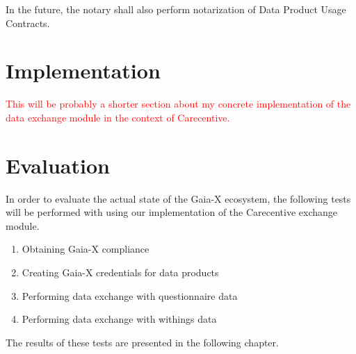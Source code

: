 In the future, the notary shall also perform notarization of Data Product Usage Contracts. %

\section{Implementation}\label{sec:implementation}

\textcolor{red}{This will be probably a shorter section about my concrete implementation of the data exchange module in the context of Carecentive.}

\section{Evaluation}\label{sec:evaluation}

In order to evaluate the actual state of the Gaia-X ecosystem, the following tests will be performed with using our implementation of the Carecentive exchange module.

\begin{enumerate}
    \item Obtaining Gaia-X compliance
    \item Creating Gaia-X credentials for data products
    \item Performing data exchange with questionnaire data
    \item Performing data exchange with withings data
\end{enumerate}

The results of these tests are presented in the following chapter.
